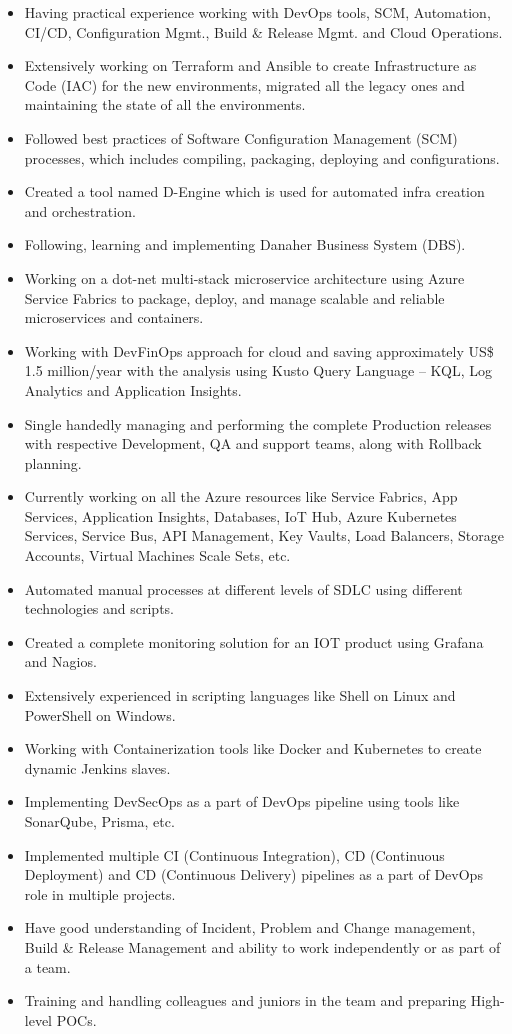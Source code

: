 \documentclass[11pt, a4paper]{article}
\begin{document}
\begin{itemize}[noitemsep, nolistsep,leftmargin=5mm,rightmargin=2mm,label=\textcolor{NavyBlue}{\textbullet}]
\item Having practical experience working with DevOps tools, SCM, Automation, CI/CD, Configuration Mgmt., Build \& Release Mgmt. and Cloud Operations.
\item Extensively working on Terraform and Ansible to create Infrastructure as Code (IAC) for the new environments, migrated all the legacy ones and maintaining the state of all the environments.
\item Followed best practices of Software Configuration Management (SCM) processes, which includes compiling, packaging, deploying and configurations.
\item Created a tool named D-Engine which is used for automated infra creation and orchestration.
\item Following, learning and implementing Danaher Business System (DBS).
\item Working on a dot-net multi-stack microservice architecture using Azure Service Fabrics to package, deploy, and manage scalable and reliable microservices and containers.
\item Working with DevFinOps approach for cloud and saving  approximately US\$ 1.5 million/year with the analysis using Kusto Query Language – KQL, Log Analytics and Application Insights.
\item Single handedly managing and performing the complete Production releases with respective Development, QA and support teams, along with Rollback planning.
\item Currently working on all the Azure resources like Service Fabrics, App Services, Application Insights, Databases, IoT Hub, Azure Kubernetes Services, Service Bus, API Management, Key Vaults, Load Balancers, Storage Accounts, Virtual Machines Scale Sets, etc.
\item Automated manual processes at different levels of SDLC using different technologies and scripts.
\item Created a complete monitoring solution for an IOT product using Grafana and Nagios.
\item Extensively experienced in scripting languages like Shell on Linux and PowerShell on Windows.
\item Working with Containerization tools like Docker and Kubernetes to create dynamic Jenkins slaves.
\item Implementing DevSecOps as a part of DevOps pipeline using tools like SonarQube, Prisma, etc.
\item Implemented multiple CI (Continuous Integration), CD (Continuous Deployment) and CD (Continuous Delivery) pipelines as a part of DevOps role in multiple projects.
\item Have good understanding of Incident, Problem and Change management, Build \& Release Management and ability to work independently or as part of a team.
\item Training and handling colleagues and juniors in the team and preparing High-level POCs.
\end{itemize}
\pagebreak
\end{document}
